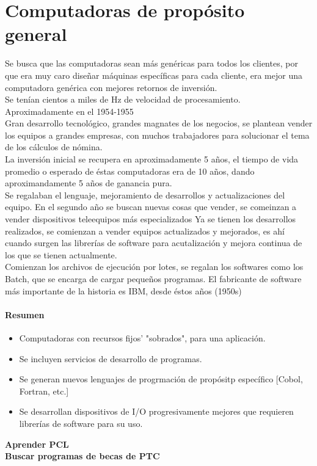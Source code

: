 \section{Computadoras de prop\'{o}sito general}
Se busca que las computadoras sean m\'{a}s gen\'{e}ricas para todos los clientes, por que era muy caro dise\~{n}ar m\'{a}quinas espec\'{i}ficas para cada cliente, era mejor una computadora gen\'{e}rica con mejores retornos de inversi\'{o}n.\\
Se ten\'{i}an cientos a miles de Hz de velocidad de procesamiento.\\
Aproximadamente en el 1954-1955\\
Gran desarrollo tecnol\'{o}gico, grandes magnates de los negocios, se plantean vender los equipos a grandes empresas, con muchos trabajadores para solucionar el tema de los c\'{a}lculos de n\'{o}mina.\\
La inversi\'{o}n inicial se recupera en aproximadamente 5 a\~{n}os, el tiempo de vida promedio o esperado de \'{e}stas computadoras era de 10 a\~{n}os, dando aproximandamente 5 a\~{n}os de ganancia pura.\\
Se regalaban el lenguaje, mejoramiento de desarrollos y actualizaciones del equipo.
En el segundo a\~{n}o se buscan nuevas cosas que vender, se comeinzan a vender dispositivos teleequipos m\'{a}s especializados
Ya se tienen los desarrollos realizados, se comienzan a vender equipos actualizados y mejorados, es ah\'{i} cuando surgen las librer\'{i}as de software para acutalizaci\'{o}n y mejora continua de los que se tienen actualmente.\\
Comienzan los archivos de ejecuci\'{o}n por lotes, se regalan los softwares como los Batch, que se encarga de cargar peque\~{n}os programas.
El fabricante de software m\'{a}s importante de la historia es IBM, desde \'{e}stos a\~{n}os (1950s)


\paragraph{Resumen}
\begin{itemize}
	\item Computadoras con recursos  fijos' "sobrados", para una aplicaci\'{o}n.
	\item Se incluyen servicios de desarrollo de programas.
	\item Se generan nuevos lenguajes de progrmaci\'{o}n de prop\'{o}sitp espec\'{i}fico [Cobol, Fortran, etc.]
	\item Se desarrollan dispositivos de I/O progresivamente mejores que requieren librer\'{i}as de software para su uso.
\end{itemize}
\textbf{Aprender PCL}\\
\textbf{Buscar programas de becas de PTC}\\


